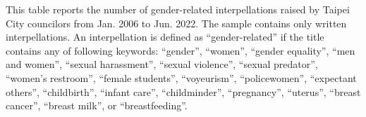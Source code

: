 \begin{table}[]

    \caption{Frequency of Gender-related Interpellations in Taipei City Council (2006 - 2022)}
    \label{tab:interpellation}


    \begin{tablenotes}
        This table reports the number of gender-related interpellations raised by Taipei City councilors from Jan. 2006 to Jun. 2022. The sample contains only written interpellations. An interpellation is defined as ``gender-related'' if the title contains any of following keywords: ``gender'', ``women'', ``gender equality'', ``men and women'', ``sexual harassment'', ``sexual violence'', ``sexual predator'', ``women's restroom'', ``female students'', ``voyeurism'', ``policewomen'', ``expectant others'', ``childbirth'', ``infant care'', ``childminder'', ``pregnancy'', ``uterus'', ``breast cancer'', ``breast milk'', or ``breastfeeding''.
    \end{tablenotes}
\end{table}